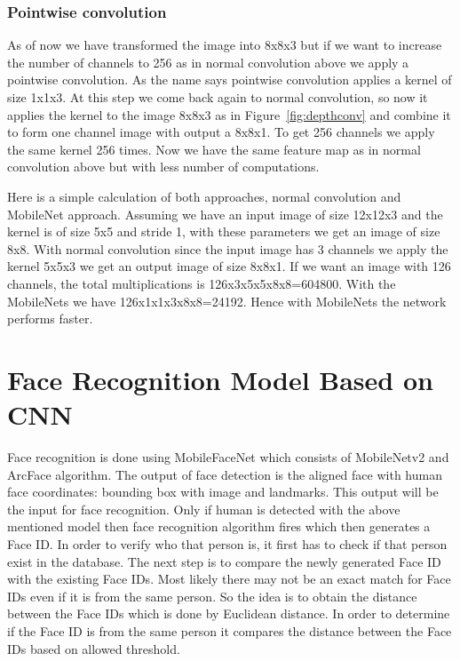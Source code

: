 \subsubsection{Pointwise convolution}
As of now we have transformed the image into 8x8x3 but if we want to increase the number of channels to 256 as in normal convolution above we apply a pointwise convolution. As the name says pointwise convolution applies a kernel of size 1x1x3. At this step we come back again to normal convolution, so now it applies the kernel to the image 8x8x3 as in Figure~\ref{fig:depthconv} and combine it to form one channel image with output a 8x8x1. To get 256 channels we apply the same kernel 256 times. Now we have the same feature map as in normal convolution above but with less number of computations. 

Here is a simple calculation of both approaches, normal convolution and MobileNet approach. 
Assuming we have an input image of size 12x12x3 and the kernel is of size 5x5 and stride 1, with these parameters we get an image of size 8x8.
With normal convolution since the input image has 3 channels we apply the kernel 5x5x3 we get an output image of size 8x8x1. If we want an image with 126 channels, the total multiplications is 126x3x5x5x8x8=604800. With the MobileNets we have 126x1x1x3x8x8=24192. Hence with MobileNets the network performs faster.


\section{Face Recognition Model Based on CNN}

Face recognition is done using MobileFaceNet \cite{DBLP:journals/corr/HowardZCKWWAA17} which consists of MobileNetv2 \cite{DBLP:journals/corr/abs-1801-04381} and ArcFace algorithm. The output of face detection is the aligned face with human face coordinates: bounding box with image and landmarks. This output will be the input for face recognition. Only if human is detected with the above mentioned model then face recognition algorithm fires which then generates a Face ID. In order to verify who that person is, it first has to check if that person exist in the database. The next step is to compare the newly generated Face ID with the existing Face IDs. Most likely there may not be an exact match for Face IDs even if it is from the same person. So the idea is to obtain the distance between the Face IDs which is done by Euclidean distance. In order to determine if the Face ID is from the same person it compares the distance between the Face IDs based on allowed threshold. 

